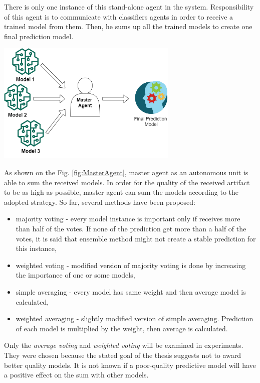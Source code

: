 There is only one instance of this stand-alone agent in the system. Responsibility of this agent is to communicate with classifiers agents in order to receive a trained model from them. Then, he sums up all the trained models to create one final prediction model.

\begin{center}
	\includegraphics[width=0.65\textwidth, keepaspectratio]{diagrams/master-agent}
	\center
	\label{fig:MasterAgent}
\end{center}

As shown on the Fig. \ref{fig:MasterAgent}, master agent as an autonomous unit is able to sum the received models.
In order for the quality of the received artifact to be as high as possible, master agent can sum the models according to the adopted strategy. So far, several methods have been proposed: 
\begin{itemize}
	\item majority voting - every model instance is important only if receives more than half of the votes. If none of the prediction get more than a half of the votes, it is said that ensemble method might not create a stable prediction for this instance,
	\item weighted voting - modified version of majority voting is done by increasing the importance of one or some models,
	\item simple averaging - every model has same weight and then average model is calculated,
	\item weighted averaging - slightly modified version of simple averaging. Prediction of each model is multiplied by the weight, then average is calculated.
\end{itemize}

Only the \textit{average voting} and \textit{weighted voting} will be examined in experiments. They were chosen because the stated goal of the thesis suggests not to award better quality models. It is not known if a poor-quality predictive model will have a positive effect on the sum with other models.

